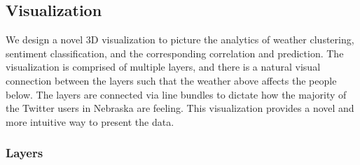 %
%
%




\subsection{Visualization}
\label{sec:vis}

We design a novel 3D visualization to picture the analytics of weather clustering, sentiment classification, and the corresponding correlation and prediction. The visualization is comprised of multiple layers, and there is a natural visual connection between the layers such that the weather above affects the people below.
The layers are connected via line bundles to dictate how the majority of the Twitter users in Nebraska are feeling. This visualization provides a novel and more intuitive way to present the data.

\subsubsection{Layers}

